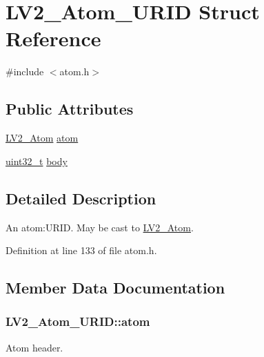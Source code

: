 \hypertarget{struct_l_v2___atom___u_r_i_d}{}\section{L\+V2\+\_\+\+Atom\+\_\+\+U\+R\+ID Struct Reference}
\label{struct_l_v2___atom___u_r_i_d}


{\ttfamily \#include $<$atom.\+h$>$}

\subsection*{Public Attributes}
\begin{DoxyCompactItemize}
\item 
\hyperlink{struct_l_v2___atom}{L\+V2\+\_\+\+Atom} \hyperlink{struct_l_v2___atom___u_r_i_d_ad38ff3bf680e1cc9c1c71725d2127b1a}{atom}
\item 
\hyperlink{lib-src_2ffmpeg_2win32_2stdint_8h_a6eb1e68cc391dd753bc8ce896dbb8315}{uint32\+\_\+t} \hyperlink{struct_l_v2___atom___u_r_i_d_a6f5957eed2cfbded3e8c6fe7524111cf}{body}
\end{DoxyCompactItemize}


\subsection{Detailed Description}
An atom\+:U\+R\+ID. May be cast to \hyperlink{struct_l_v2___atom}{L\+V2\+\_\+\+Atom}. 

Definition at line 133 of file atom.\+h.



\subsection{Member Data Documentation}
\subsubsection[{\texorpdfstring{atom}{atom}}]{ L\+V2\+\_\+\+Atom\+\_\+\+U\+R\+I\+D\+::atom}\hypertarget{struct_l_v2___atom___u_r_i_d_ad38ff3bf680e1cc9c1c71725d2127b1a}{}\label{struct_l_v2___atom___u_r_i_d_ad38ff3bf680e1cc9c1c71725d2127b1a}
Atom header. 

